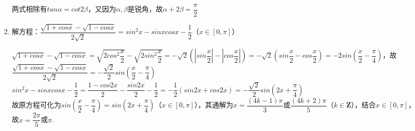 \begin{enumerate}
\begin{enumerate}
\begin{jieda}
            
            两式相除有$tan\alpha = cot2\beta$，又因为$\alpha, \beta$是锐角，故$\alpha + 2\beta = \dfrac{\pi}{2}$
        \end{jieda}
        \item 解方程：$\dfrac{\sqrt{1+cos x}-\sqrt{1-cos x}}{2\sqrt{2}} = sin^{2}x -sinxcosx - \dfrac{1}{2}$（$x \in [0, \pi]$）
        \begin{jieda}
            $\sqrt{1+cos x}-\sqrt{1-cos x} = \sqrt{2cos^2\dfrac{x}{2}} - \sqrt{2sin^2\dfrac{x}{2}} = -\sqrt{2}\left(\left| sin\dfrac{x}{2}\right| - \left| cos\dfrac{x}{2} \right|\right) = -\sqrt{2}\left( sin\dfrac{x}{2} - cos\dfrac{x}{2} \right) = -2sin\left(\dfrac{x}{2}-\dfrac{\pi}{4}\right)$，故$\dfrac{\sqrt{1+cos x}-\sqrt{1-cos x}}{2\sqrt{2}} = -\dfrac{\sqrt{2}}{2}sin\left(\dfrac{x}{2}-\dfrac{\pi}{4}\right)$ \\
            $sin^{2}x -sinxcosx - \dfrac{1}{2} = \dfrac{1-cos2x}{2}-\dfrac{sin2x}{2} - \dfrac{1}{2} = -\dfrac{1}{2}(sin2x + cos2x) = -\dfrac{\sqrt{2}}{2}sin(2x+\dfrac{\pi}{4})$ \\
            故原方程可化为$sin\left(\dfrac{x}{2}-\dfrac{\pi}{4}\right) = sin(2x+\dfrac{\pi}{4})$（$x \in [0, \pi]$），其通解为$x = \dfrac{(4k-1)\pi}{3}$或$\dfrac{(4k+2)\pi}{5}$（$k \in \mathbf{Z}$），结合$x \in [0, \pi]$，故$x = \dfrac{2\pi}{5}$或$\pi$.
        \end{jieda}
       

\end{enumerate}
\end{enumerate}
